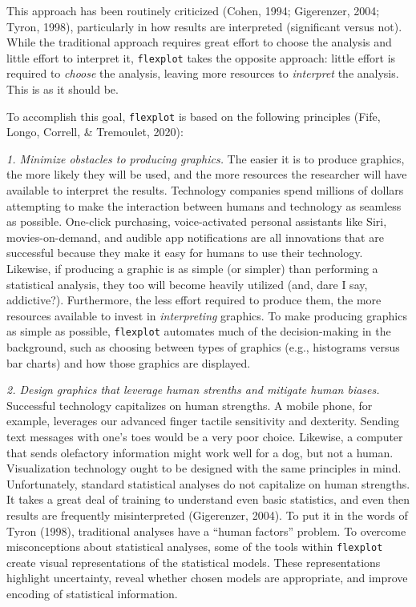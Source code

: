 \documentclass[
  english,
  man]{apa6}
\begin{document}
This approach has been routinely criticized (Cohen, 1994; Gigerenzer, 2004; Tyron, 1998), particularly in how results are interpreted (significant versus not). While the traditional approach requires great effort to choose the analysis and little effort to interpret it, \texttt{flexplot} takes the opposite approach: little effort is required to \emph{choose} the analysis, leaving more resources to \emph{interpret} the analysis. This is as it should be.

To accomplish this goal, \texttt{flexplot} is based on the following principles (Fife, Longo, Correll, \& Tremoulet, 2020):

\emph{1. Minimize obstacles to producing graphics.} The easier it is to produce graphics, the more likely they will be used, and the more resources the researcher will have available to interpret the results. Technology companies spend millions of dollars attempting to make the interaction between humans and technology as seamless as possible. One-click purchasing, voice-activated personal assistants like Siri, movies-on-demand, and audible app notifications are all innovations that are successful because they make it easy for humans to use their technology. Likewise, if producing a graphic is as simple (or simpler) than performing a statistical analysis, they too will become heavily utilized (and, dare I say, addictive?). Furthermore, the less effort required to produce them, the more resources available to invest in \emph{interpreting} graphics. To make producing graphics as simple as possible, \texttt{flexplot} automates much of the decision-making in the background, such as choosing between types of graphics (e.g., histograms versus bar charts) and how those graphics are displayed.

\emph{2. Design graphics that leverage human strenths and mitigate human biases.} Successful technology capitalizes on human strengths. A mobile phone, for example, leverages our advanced finger tactile sensitivity and dexterity. Sending text messages with one's toes would be a very poor choice. Likewise, a computer that sends olefactory information might work well for a dog, but not a human. Visualization technology ought to be designed with the same principles in mind. Unfortunately, standard statistical analyses do not capitalize on human strengths. It takes a great deal of training to understand even basic statistics, and even then results are frequently misinterpreted (Gigerenzer, 2004). To put it in the words of Tyron (1998), traditional analyses have a ``human factors'' problem. To overcome misconceptions about statistical analyses, some of the tools within \texttt{flexplot} create visual representations of the statistical models. These representations highlight uncertainty, reveal whether chosen models are appropriate, and improve encoding of statistical information.
\end{document}
